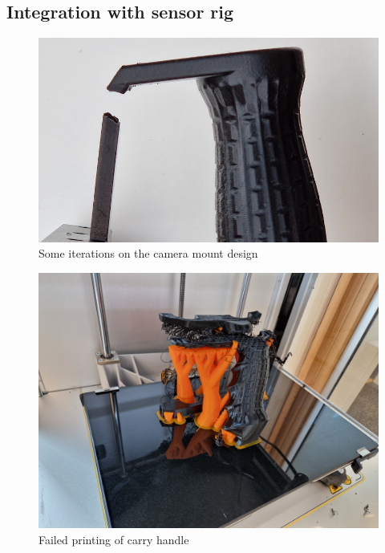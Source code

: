 \subsection{Integration with sensor rig}

\begin{figure}[H]
    \centering
    \includegraphics[width=\textwidth]{figures/3d_print/break.png}
    \caption{Some iterations on the camera mount design}
    \label{fig:handle_break}
\end{figure}

\begin{figure}[H]
    \centering
    \includegraphics[width=\textwidth]{figures/3d_print/failed.jpg}
    \caption{Failed printing of carry handle}
    \label{fig:handle_fail}
\end{figure}

